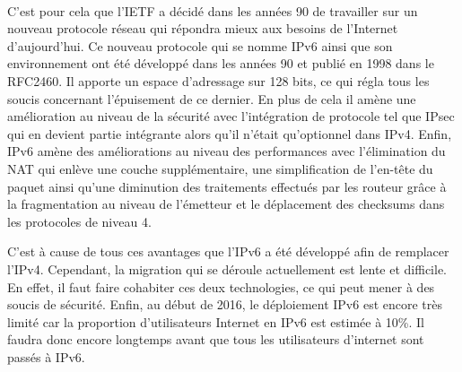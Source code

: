 \\
C'est pour cela que l'IETF a décidé dans les années 90 de travailler sur un nouveau protocole 
réseau qui répondra mieux aux besoins de l'Internet d'aujourd'hui. Ce nouveau protocole qui se nomme
IPv6 ainsi que son environnement ont été développé dans les années 90 et publié en 1998
 dans le RFC2460. Il apporte un espace d'adressage sur 128 bits, ce qui régla tous les soucis
 concernant l'épuisement de ce dernier. 
En plus de cela il amène une amélioration au niveau de la sécurité avec l'intégration de protocole
 tel que IPsec qui en devient partie intégrante alors qu'il n'était qu'optionnel dans IPv4. Enfin,
 IPv6 amène des améliorations au niveau des performances avec l'élimination du NAT qui enlève une
 couche supplémentaire, une simplification de l'en-tête du paquet ainsi qu'une diminution des
 traitements effectués par les routeur grâce à la fragmentation au niveau de l'émetteur et le déplacement des
 checksums dans les protocoles de niveau 4.

C'est à cause de tous ces avantages que l'IPv6 a été développé afin de remplacer l'IPv4. 
Cependant, la migration qui se déroule actuellement est lente et difficile. En effet, il 
faut faire cohabiter ces deux technologies, ce qui peut mener à des soucis de sécurité. Enfin, au 
début de 2016, le déploiement IPv6 est encore très limité car la proportion d'utilisateurs Internet en
 IPv6 est estimée à 10\%. Il faudra donc encore longtemps avant que tous les utilisateurs d'internet 
sont passés à IPv6.



